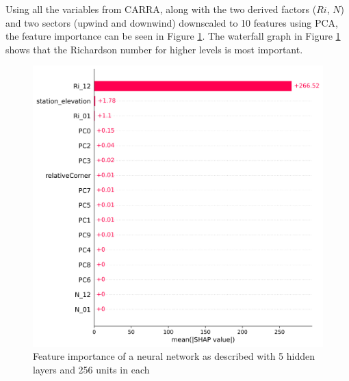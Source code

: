 Using all the variables from CARRA, along with the two derived factors ($Ri$, $N$) and two sectors (upwind and downwind) downscaled to 10 features using PCA, the feature importance can be seen in Figure \ref{fig:ShapleyWaterfallFirstTry}. The waterfall graph in Figure \ref{fig:ShapleyWaterfallFirstTry} shows that the Richardson number for higher levels is most important.

\begin{figure}[h]
    \caption{Feature importance of a neural network as described with 5 hidden layers and 256 units in each}
    \label{fig:ShapleyWaterfallFirstTry}
    \centering
    \includegraphics[scale = 0.6]{Figures/shap_bar_nn_256_example100.png}
\end{figure}
